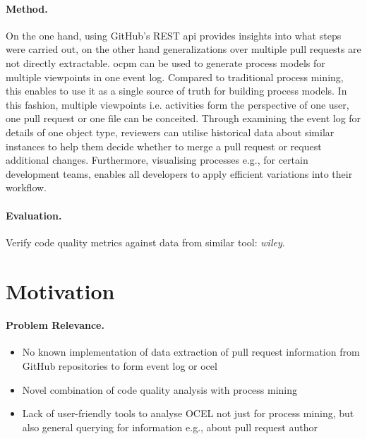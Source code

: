 \paragraph{Method.} On the one hand, using GitHub's REST \ac{api} provides insights into what steps were carried out, on the other hand generalizations over multiple pull requests are not directly extractable. \Ac{ocpm} can be used to generate process models for multiple viewpoints in one event log. Compared to traditional process mining, this enables to use it as a single source of truth for building process models. In this fashion, multiple viewpoints i.e. activities form the perspective of one user, one pull request or one file can be conceited. Through examining the event log for details of one object type, reviewers can utilise historical data about similar instances to help them decide whether to merge a pull request or request additional changes. Furthermore, visualising processes e.g., for certain development teams, enables all developers to apply efficient variations into their workflow.

\paragraph{Evaluation.} Verify code quality metrics against data from similar tool: \emph{wiley}.

\section{Motivation}
\label{sec:intro_ssec:motiv}
\paragraph{Problem Relevance.} 
\begin{itemize}
	\item No known implementation of data extraction of pull request information from GitHub repositories to form event log or \ac{ocel}
	\item Novel combination of code quality analysis with process mining
	\item Lack of user-friendly tools to analyse OCEL not just for process mining, but also general querying for information e.g., about pull request author
\end{itemize}

